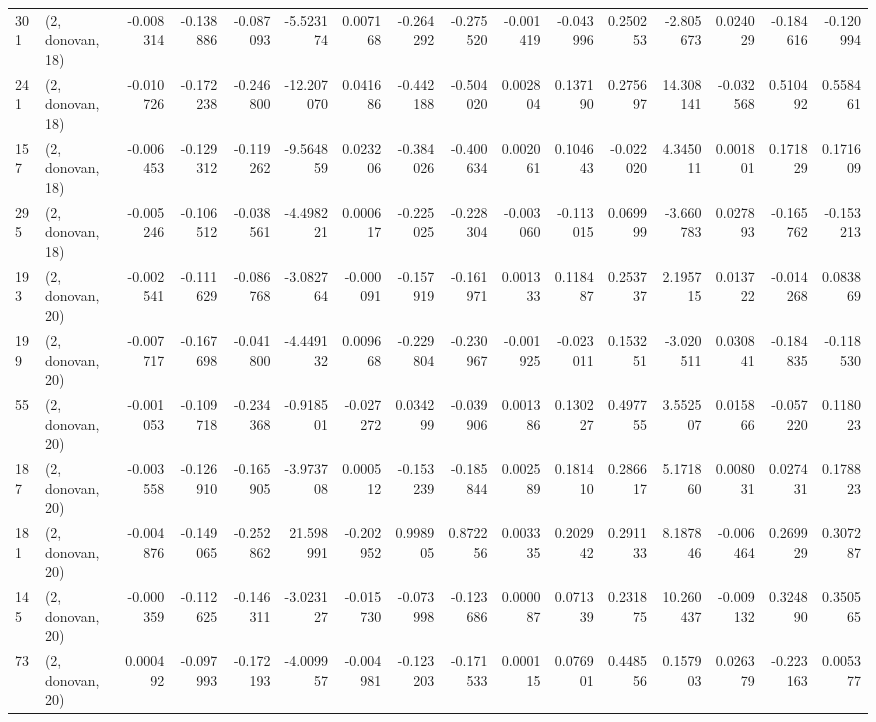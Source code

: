 \begin{tabular}{llrrrrrrrrrrrrrr}
301 &  (2, donovan, 18) &  -0.008314 & -0.138886 & -0.087093 &   -5.523174 &  0.007168 &  -0.264292 & -0.275520 & -0.001419 & -0.043996 &  0.250253 &   -2.805673 &  0.024029 & -0.184616 & -0.120994 \\
241 &  (2, donovan, 18) &  -0.010726 & -0.172238 & -0.246800 &  -12.207070 &  0.041686 &  -0.442188 & -0.504020 &  0.002804 &  0.137190 &  0.275697 &   14.308141 & -0.032568 &  0.510492 &  0.558461 \\
157 &  (2, donovan, 18) &  -0.006453 & -0.129312 & -0.119262 &   -9.564859 &  0.023206 &  -0.384026 & -0.400634 &  0.002061 &  0.104643 & -0.022020 &    4.345011 &  0.001801 &  0.171829 &  0.171609 \\
295 &  (2, donovan, 18) &  -0.005246 & -0.106512 & -0.038561 &   -4.498221 &  0.000617 &  -0.225025 & -0.228304 & -0.003060 & -0.113015 &  0.069999 &   -3.660783 &  0.027893 & -0.165762 & -0.153213 \\
193 &  (2, donovan, 20) &  -0.002541 & -0.111629 & -0.086768 &   -3.082764 & -0.000091 &  -0.157919 & -0.161971 &  0.001333 &  0.118487 &  0.253737 &    2.195715 &  0.013722 & -0.014268 &  0.083869 \\
199 &  (2, donovan, 20) &  -0.007717 & -0.167698 & -0.041800 &   -4.449132 &  0.009668 &  -0.229804 & -0.230967 & -0.001925 & -0.023011 &  0.153251 &   -3.020511 &  0.030841 & -0.184835 & -0.118530 \\
55  &  (2, donovan, 20) &  -0.001053 & -0.109718 & -0.234368 &   -0.918501 & -0.027272 &   0.034299 & -0.039906 &  0.001386 &  0.130227 &  0.497755 &    3.552507 &  0.015866 & -0.057220 &  0.118023 \\
187 &  (2, donovan, 20) &  -0.003558 & -0.126910 & -0.165905 &   -3.973708 &  0.000512 &  -0.153239 & -0.185844 &  0.002589 &  0.181410 &  0.286617 &    5.171860 &  0.008031 &  0.027431 &  0.178823 \\
181 &  (2, donovan, 20) &  -0.004876 & -0.149065 & -0.252862 &   21.598991 & -0.202952 &   0.998905 &  0.872256 &  0.003335 &  0.202942 &  0.291133 &    8.187846 & -0.006464 &  0.269929 &  0.307287 \\
145 &  (2, donovan, 20) &  -0.000359 & -0.112625 & -0.146311 &   -3.023127 & -0.015730 &  -0.073998 & -0.123686 &  0.000087 &  0.071339 &  0.231875 &   10.260437 & -0.009132 &  0.324890 &  0.350565 \\
73  &  (2, donovan, 20) &   0.000492 & -0.097993 & -0.172193 &   -4.009957 & -0.004981 &  -0.123203 & -0.171533 &  0.000115 &  0.076901 &  0.448556 &    0.157903 &  0.026379 & -0.223163 &  0.005377 \\

\end{tabular}
